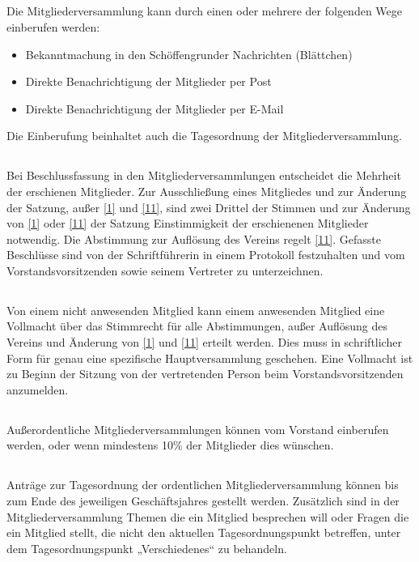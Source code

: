	
	\subsection{}
	Die Mitgliederversammlung kann durch einen oder mehrere der folgenden Wege einberufen werden:
		\begin{itemize}
			\item Bekanntmachung in den Schöffengrunder Nachrichten (Blättchen)
			\item Direkte Benachrichtigung der Mitglieder per Post
			\item Direkte Benachrichtigung der Mitglieder per E-Mail
		\end{itemize}
	Die Einberufung beinhaltet auch die Tagesordnung der Mitgliederversammlung.
	
	\subsection{} Bei Beschlussfassung in den Mitgliederversammlungen entscheidet die Mehrheit der erschienen Mitglieder. Zur Ausschließung eines Mitgliedes und zur Änderung der Satzung, außer \ref{1} und \ref{11}, sind zwei Drittel der Stimmen und zur Änderung von \ref{1} oder \ref{11} der Satzung Einstimmigkeit der erschienenen Mitglieder notwendig. Die Abstimmung zur Auflösung des Vereins regelt \ref{11}. Gefasste Beschlüsse sind von der Schriftführerin in einem Protokoll festzuhalten und vom Vorstandsvorsitzenden sowie seinem Vertreter zu unterzeichnen.
	
	\subsection{} Von einem nicht anwesenden Mitglied kann einem anwesenden Mitglied eine Vollmacht über das Stimmrecht für alle Abstimmungen, außer Auflösung des Vereins und Änderung von \ref{1} und \ref{11} erteilt werden. Dies muss in schriftlicher Form für genau eine spezifische Hauptversammlung geschehen. Eine Vollmacht ist zu Beginn der Sitzung von der vertretenden Person beim Vorstandsvorsitzenden anzumelden.
	
	\subsection{} Außerordentliche Mitgliederversammlungen können vom Vorstand einberufen werden, oder wenn mindestens 10\% der Mitglieder dies wünschen.
	
	\subsection{} Anträge zur Tagesordnung der ordentlichen Mitgliederversammlung können  
	bis zum Ende des jeweiligen Geschäftsjahres gestellt werden. Zusätzlich sind in der Mitgliederversammlung Themen die ein Mitglied besprechen will oder Fragen die ein Mitglied stellt, die nicht den aktuellen Tagesordnungspunkt betreffen, unter dem Tagesordnungspunkt „Verschiedenes“ zu behandeln.

